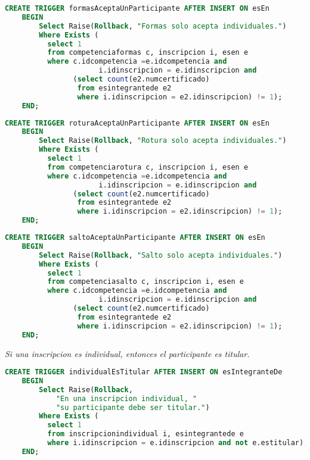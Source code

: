 \begin{lstlisting}[language=SQL]
CREATE TRIGGER formasAceptaUnParticipante AFTER INSERT ON esEn
    BEGIN
        Select Raise(Rollback, "Formas solo acepta individuales.")
        Where Exists (
          select 1
          from competenciaformas c, inscripcion i, esen e
          where c.idcompetencia =e.idcompetencia and
                      i.idinscripcion = e.idinscripcion and
                (select count(e2.numcertificado)
                 from esintegrantede e2
                 where i.idinscripcion = e2.idinscripcion) != 1);
    END;
\end{lstlisting}

\begin{lstlisting}[language=SQL]
CREATE TRIGGER roturaAceptaUnParticipante AFTER INSERT ON esEn
    BEGIN
        Select Raise(Rollback, "Rotura solo acepta individuales.")
        Where Exists (
          select 1
          from competenciarotura c, inscripcion i, esen e
          where c.idcompetencia =e.idcompetencia and
                      i.idinscripcion = e.idinscripcion and
                (select count(e2.numcertificado)
                 from esintegrantede e2
                 where i.idinscripcion = e2.idinscripcion) != 1);
    END;
\end{lstlisting}

\begin{lstlisting}[language=SQL]
CREATE TRIGGER saltoAceptaUnParticipante AFTER INSERT ON esEn
    BEGIN
        Select Raise(Rollback, "Salto solo acepta individuales.")
        Where Exists (
          select 1
          from competenciasalto c, inscripcion i, esen e
          where c.idcompetencia =e.idcompetencia and
                      i.idinscripcion = e.idinscripcion and
                (select count(e2.numcertificado)
                 from esintegrantede e2
                 where i.idinscripcion = e2.idinscripcion) != 1);
    END;
\end{lstlisting}

\emph{Si una inscripcion es individual, entonces el participante es titular.}

\begin{lstlisting}[language=SQL]
CREATE TRIGGER individualEsTitular AFTER INSERT ON esIntegranteDe
    BEGIN
        Select Raise(Rollback,
            "En una inscripcion individual, "
            "su participante debe ser titular.")
        Where Exists (
          select 1
          from inscripcionindividual i, esintegrantede e
          where i.idinscripcion = e.idinscripcion and not e.estitular);
    END;
\end{lstlisting}

